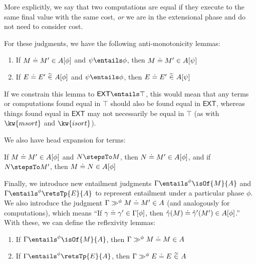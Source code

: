 \documentclass[letterpaper]{article}
\newcommand{\EXT}{\textsf{EXT}}
\newcommand{\gyat}{\hat{\gamma}}
\begin{document}
More explicitly, we say that two computations are equal if they execute to the same final value with the same cost, \textit{or} we are in the extensional phase and do not need to consider cost.

\bigskip

For these judgments, we have the following anti-monotonicity lemmas:
\begin{lemma}\label{lem:anti-mono}\phantom{nextline}
    \begin{enumerate}
        \item If $M\mathrel{\doteq}M' \in A [\phi]$ and $\psi \entails \phi$, then $M\mathrel{\doteq}M' \in A [\psi]$
        \item If $E\mathrel{\doteq}E'\ \widetilde{\in}\ A [\phi]$ and $\psi \entails \phi$, then $E\mathrel{\doteq}E'\ \widetilde{\in}\ A [\psi]$
    \end{enumerate}
\end{lemma}

If we constrain this lemma to $\EXT \entails \top$, this would mean that any terms or computations found equal in $\top$ should also be found equal in $\EXT$,
whereas things found equal in $\EXT$ may not necessarily be equal in $\top$ (as with $\kw{msort}$ and $\kw{isort}$).

We also have head expansion for terms:
\begin{lemma}\label{lem:he}
    If $M\mathrel{\doteq}M' \in A [\phi]$ and $N \stepsTo M$, then $N\mathrel{\doteq}M' \in A [\phi]$, and if $N \stepsTo M'$, then $M\mathrel{\doteq}N \in A [\phi]$
\end{lemma}

Finally, we introduce new entailment judgments $\Gamma \entailsPhase{\phi} \isOf{M}{A}$ and $\Gamma \entailsPhase{\phi} \retsTp{E}{A}$ to represent entailment under a particular phase $\phi$.
We also introduce the judgment $\Gamma \gg^\phi M\mathrel{\doteq}M' \in A$ (and analogously for computations), which means ``If $\gamma\mathrel{\doteq}\gamma' \in \Gamma [\phi]$, then $\exEqOfPhase{\gyat(M)}{\gyat'(M')}{A}{\phi}$.''
With these, we can define the reflexivity lemmas:
\begin{lemma}\label{lem:refl}\phantom{nextline}
    \begin{enumerate}
        \item If $\Gamma \entailsPhase{\phi} \isOf{M}{A}$, then $\Gamma \gg^\phi M\mathrel{\doteq}M \in A$
        \item If $\Gamma \entailsPhase{\phi} \retsTp{E}{A}$, then $\Gamma \gg^\phi E\mathrel{\doteq}E\ \widetilde{\in}\ A$
    \end{enumerate}
\end{lemma}
\end{document}
